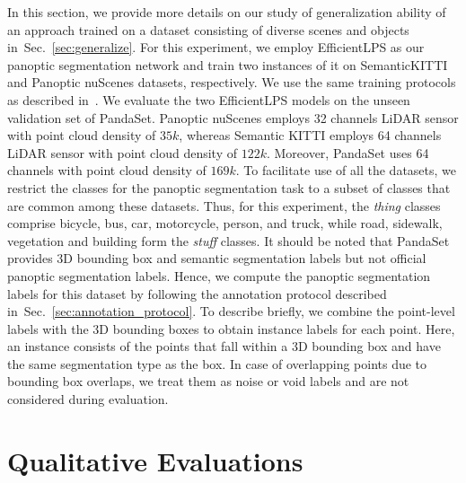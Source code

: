 \documentclass[letterpaper, 10 pt, journal, twoside]{IEEEtran}
\newcommand{\secref}[1]{Sec.~\ref{#1}}
\begin{document}
In this section, we provide more details on our study of generalization ability of an approach trained on a dataset consisting of diverse scenes and objects in~\secref{sec:generalize}. For this experiment, we employ EfficientLPS as our panoptic segmentation network and train two instances of it on SemanticKITTI and Panoptic nuScenes datasets, respectively. We use the same training protocols as described in~\cite{mohan2020efficientps}. We evaluate the two EfficientLPS models on the unseen validation set of PandaSet. Panoptic nuScenes employs 32 channels LiDAR sensor with point cloud density of $35k$, whereas Semantic KITTI employs 64 channels LiDAR sensor with point cloud density of $122k$. Moreover, PandaSet uses 64 channels with point cloud density of $169k$. To facilitate use of all the datasets, we restrict the classes for the panoptic segmentation task to a subset of classes that are common among these datasets. Thus, for this experiment, the \textit{thing} classes comprise bicycle, bus, car, motorcycle, person, and truck, while road, sidewalk, vegetation and building form the \textit{stuff} classes. It should be noted that PandaSet provides 3D bounding box and semantic segmentation labels but not official panoptic segmentation labels. Hence, we compute the panoptic segmentation labels for this dataset by following the annotation protocol described in~\secref{sec:annotation_protocol}. To describe briefly, we combine the point-level labels with the 3D bounding boxes to obtain instance labels for each point. Here, an instance consists of the points that fall within a 3D bounding box and have the same segmentation type as the box. In case of overlapping points due to bounding box overlaps, we treat them as noise or void labels and are not considered during evaluation. 

\section{Qualitative Evaluations}
\end{document}
